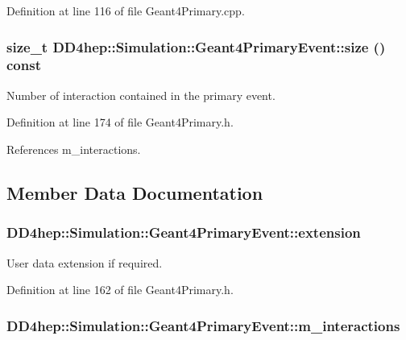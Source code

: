 Definition at line 116 of file Geant4Primary.cpp.\hypertarget{class_d_d4hep_1_1_simulation_1_1_geant4_primary_event_a10329326a00d8bc0cd0570677677538b}{
\subsubsection[{size}]{\setlength{\rightskip}{0pt plus 5cm}size\_\-t DD4hep::Simulation::Geant4PrimaryEvent::size () const}}
\label{class_d_d4hep_1_1_simulation_1_1_geant4_primary_event_a10329326a00d8bc0cd0570677677538b}


Number of interaction contained in the primary event. 

Definition at line 174 of file Geant4Primary.h.

References m\_\-interactions.

\subsection{Member Data Documentation}
\hypertarget{class_d_d4hep_1_1_simulation_1_1_geant4_primary_event_a91db5fc340c2b13402f920b62ba45eb9}{
\subsubsection[{extension}]{ {\bf DD4hep::Simulation::Geant4PrimaryEvent::extension}}}
\label{class_d_d4hep_1_1_simulation_1_1_geant4_primary_event_a91db5fc340c2b13402f920b62ba45eb9}


User data extension if required. 

Definition at line 162 of file Geant4Primary.h.\hypertarget{class_d_d4hep_1_1_simulation_1_1_geant4_primary_event_accff0a45f858135ce13050e2b1cdb706}{
\subsubsection[{m\_\-interactions}]{ {\bf DD4hep::Simulation::Geant4PrimaryEvent::m\_\-interactions}}}
\label{class_d_d4hep_1_1_simulation_1_1_geant4_primary_event_accff0a45f858135ce13050e2b1cdb706}


